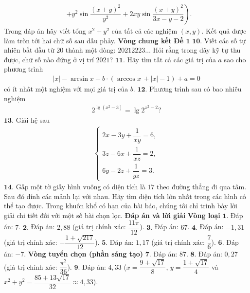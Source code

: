 \begin{multicols}{2}
\begin{align*}
		&\left.+ {y^2}\sin \dfrac{{{{(x + y)}^2}}}{{{y^2}}} + 2xy\sin \dfrac{{{{(x + y)}^2}}}{{3x - y - 2}} \right).
	\end{align*}
	Trong đáp án hãy viết tổng $x^2 + y^2$ của tất cả các nghiệm  $(x,y)$. Kết quả được làm tròn tới hai chữ số sau dấu phảy. 
	\vskip 0.1cm
	\textbf{\color{cackithi}Vòng chung kết}
	\vskip 0.1cm
	\textbf{\color{cackithi}Đề $\pmb{1}$}
	\vskip 0.1cm
	$\pmb{10.}$ Viết các số tự nhiên bắt đầu từ $20$ thành một dòng: $20212223\ldots$ Hỏi rằng trong dãy kỹ tự thu được, chữ số nào đứng ở vị trí $2021$?
	\vskip 0.1cm
	$\pmb{11.}$ Hãy tìm tất cả các giá trị của $a$ sao cho phương trình
	\begin{align*}
		|x| \!-\! \arcsin x \!+\! b \!\cdot\! (\arccos x\, \!+\! |x| \!-\! 1) \!+\! a \!=\! 0
	\end{align*}
	có ít nhât một nghiệm với mọi giá trị của $b$.
	\vskip 0.1cm
	$\pmb{12.}$ Phương trình sau có bao nhiêu nghiệm
	\begin{align*}
		{2^{\lg ({x^2} - 3)}} = \lg {2^{{x^2} - 2}}?
	\end{align*}
	$\pmb{13.}$ Giải hệ sau
	\begin{align*}
		\begin{cases}
			2x - 3y + \dfrac{1}{xy} = 6,\\
			3z - 6x + \dfrac{1}{xz} = 2,\\
			6y - 2z + \dfrac{1}{yz} = 3.
		\end{cases}
	\end{align*}
	$\pmb{14.}$ Gấp một tờ giấy hình vuông có diện tích là $17$ theo đường thẳng đi qua tâm. Sau đó dính các mảnh lại với nhau. Hãy tìm diện tích lớn nhất trong các hình có thể tạo được.
	\vskip 0.1cm
	Trong khuôn khổ có hạn của bài báo, chúng tôi chỉ trình bày lời giải chi tiết đối với một số bài chọn lọc.  
	\vskip 0.1cm 
	\textbf{\color{cackithi}Đáp án và lời giải}
	\vskip 0.1cm
	\textbf{\color{cackithi}Vòng loại}
	\vskip 0.1cm
	$\pmb{1.}$ Đáp án: $7$.
	\vskip 0.1cm
	$\pmb{2.}$ Đáp án: $2{,}88$ (giá trị chính xác: $\dfrac{11\pi}{12}$).
	\vskip 0.1cm
	$\pmb{3.}$ Đáp án: $67$.
	\vskip 0.1cm
	$\pmb{4.}$ Đáp án: $-1{,}31$ (giá trị chính xác:  $-\dfrac{1+ \sqrt{217}}{12}$).
	\vskip 0.1cm
	$\pmb{5.}$ Đáp án: $1{,}17$ (giá trị chính xác:  $\dfrac{7}{6}$).
	\vskip 0.1cm
	$\pmb{6.}$ Đáp án:  $-7$.
	\vskip 0.1cm
	\textbf{\color{cackithi}Vòng tuyển chọn (phần sáng tạo)}
	\vskip 0.1cm
	$\pmb{7.}$ Đáp án: $87$.
	\vskip 0.1cm
	$\pmb{8.}$ Đáp án: $0{,}27$ (giá trị chính xác: $\dfrac{\pi^2}{36}$).
	\vskip 0.1cm
	$\pmb{9.}$ Đáp án: $4{,}33$ ($x = \dfrac{9 + \sqrt{17}}{8}$, $y = \dfrac{1+ \sqrt{17}}{4}$ và  $x^2 + y^2 = \dfrac{85 + 13\sqrt{17}}{32} \approx 4{,}33$).

\end{multicols}
